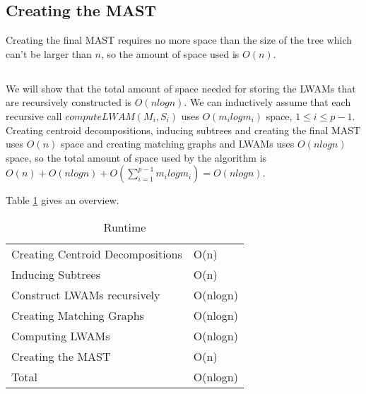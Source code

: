 \subsection{Creating the MAST}
Creating the final MAST requires no more space than the size of the tree which can't be larger than $n$, so the amount of space used is $O(n)$.

\subsection{}
We will show that the total amount of space needed for storing the LWAMs that are recursively constructed is $O(nlogn)$. We can inductively assume that each recursive call $computeLWAM(M_i, S_i)$ uses $O(m_ilogm_i)$ space, $1 \le i \le p-1$. Creating centroid decompositions, inducing subtrees and creating the final MAST uses $O(n)$ space and creating matching graphs and LWAMs uses $O(nlogn)$ space, so the total amount of space used by the algorithm is $O(n) + O(nlogn) + O(\sum_{i=1}^{p-1} m_ilogm_i) = O(nlogn)$.

Table \ref{spaceTable} gives an overview.
\begin{table}[]
	\centering
	\begin{tabular}{l|l}
		Creating Centroid Decompositions & O(n)     \\
		Inducing Subtrees                & O(n)     \\
		Construct LWAMs recursively		 & O(nlogn) \\
		Creating Matching Graphs         & O(nlogn) \\
		Computing LWAMs                  & O(nlogn) \\
		Creating the MAST                & O(n)     \\ \hline
		Total                            & O(nlogn)
	\end{tabular}
	\caption{Runtime}
	\label{spaceTable}
\end{table}





